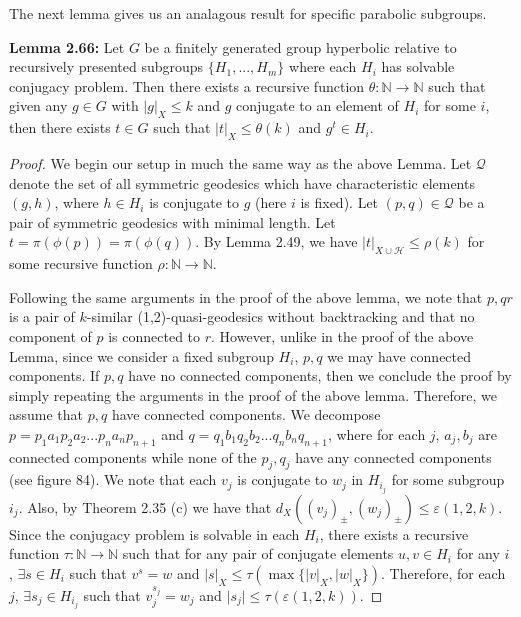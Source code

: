 \documentclass[12pt]{article}
\newcommand{\vs}{\vskip10pt}
\begin{document}
	The next lemma gives us an analagous result for specific parabolic subgroups. 
	
	\vs 
	
	\textbf{Lemma 2.66: } Let $G$ be a finitely generated group hyperbolic relative to recursively presented subgroups $\{H_1,...,H_m\}$ where each $H_i$ has solvable conjugacy problem. Then there exists a recursive function $\theta: \mathbb{N} \rightarrow \mathbb{N}$ such that given any $g \in G$ with $\vert g \vert_X \leq k$ and $g$ conjugate to an element of $H_i$ for some $i$, then there exists $t \in G$ such that $\vert t \vert_X \leq \theta(k)$ and $g^t \in H_i$. 
	
	\begin{proof}
		
		We begin our setup in much the same way as the above Lemma. Let $\mathcal{Q}$ denote the set of all symmetric geodesics which have characteristic elements $(g,h)$, where $h \in H_i$ is conjugate to $g$ (here $i$ is fixed). Let $(p,q) \in \mathcal{Q}$ be a pair of symmetric geodesics with minimal length. Let $t = \pi(\phi(p)) = \pi(\phi(q))$. By Lemma 2.49, we have $\vert t \vert_{X \cup \mathcal{H}} \leq \rho(k)$ for some recursive function $\rho : \mathbb{N} \rightarrow \mathbb{N}$. 
		
		\vs 
		
		Following the same arguments in the proof of the above lemma, we note that $p, qr$ is a pair of $k$-similar (1,2)-quasi-geodesics without backtracking and that no component of $p$ is connected to $r$. However, unlike in the proof of the above Lemma, since we consider a fixed subgroup $H_i$, $p,q$ we may have connected components. If $p,q$ have no connected components, then we conclude the proof by simply repeating the arguments in the proof of the above lemma. Therefore, we assume that $p,q$ have connected components. We decompose $p = p_1 a_1 p_2 a_2 ... p_n a_n p_{n+1}$ and $q = q_1 b_1 q_2 b_2 ... q_n b_n q_{n+1}$, where for each $j$, $a_j, b_j$ are connected components while none of the $p_j, q_j$ have any connected components (see figure 84). We note that each $v_j$ is conjugate to $w_j$ in $H_{i_j}$ for some subgroup $i_j$. Also, by Theorem 2.35 (c) we have that $d_X((v_j)_{\pm}, (w_j)_{\pm}) \leq \varepsilon(1,2,k)$. Since the conjugacy problem is solvable in each $H_i$, there exists a recursive function $\tau: \mathbb{N} \rightarrow \mathbb{N}$ such that for any pair of conjugate elements $u,v \in H_i$ for any $i$, $\exists s \in H_i$ such that $v^s = w$ and $\vert s \vert_X \leq \tau(\max \{\vert v \vert_X, \vert w \vert_X\})$. Therefore, for each $j$, $\exists s_j \in H_{i_j}$ such that $v_j^{s_j} = w_j$ and $\vert s_j \vert \leq \tau(\varepsilon(1,2,k))$. 
		

\end{proof}
\end{document}
